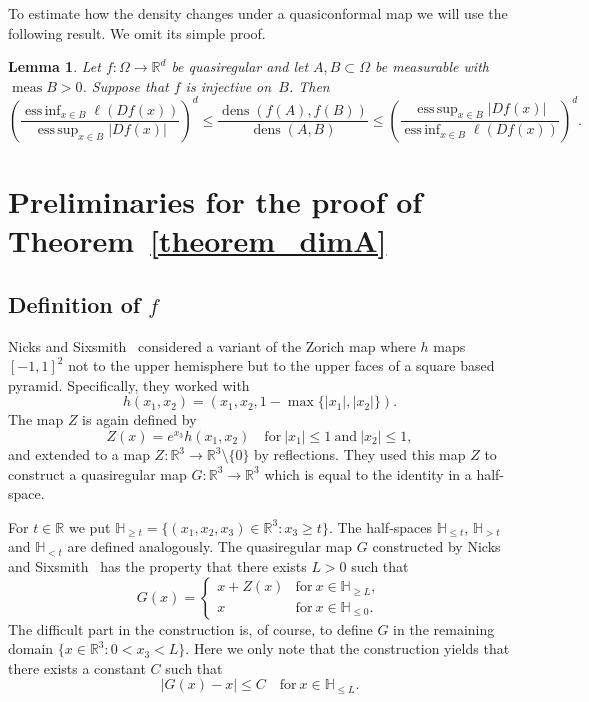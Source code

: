 \documentclass[12pt,a4paper]{amsart}
\theoremstyle{plain}
\newtheorem{lemma}[theorem]{Lemma}
\theoremstyle{definition}
\theoremstyle{remark}
\DeclareMathOperator*{\esssup}{ess\,sup}
\DeclareMathOperator*{\essinf}{ess\,inf}
\def\R{\mathbb R}
\def\H{\mathbb H}
\def\dens{\operatorname{dens}}
\def\meas{\operatorname{meas}}
\numberwithin{equation}{section}
\begin{document}
To estimate how the density changes under a quasiconformal map we will use the 
following result.
We omit its simple proof.
\begin{lemma} \label{lemma-dens}
Let $f\colon \Omega\to\R^d$ be quasiregular and let $A,B\subset \Omega$ be measurable 
with $\meas B>0$. Suppose that $f$ is injective on~$B$.
Then 
\begin{equation}\label{2b}
\left(\frac{\essinf_{x\in B}\ell(Df(x))}{\esssup_{x\in B}|Df(x)|}\right)^d
\leq 
\frac{\dens(f(A),f(B))}{\dens(A,B)}
\leq 
\left(\frac{\esssup_{x\in B}|Df(x)|}{\essinf_{x\in B}\ell(Df(x))}\right)^d .
\end{equation}
\end{lemma}


\section{Preliminaries for the proof of Theorem~\ref{theorem_dimA}} \label{proof1}
\subsection{Definition of \texorpdfstring{$f$}{f}} \label{def_f}
Nicks and Sixsmith~\cite[Section~5]{Nicks2018}
 considered a variant of the Zorich map where 
$h$ maps $[-1,1]^2$ not to the upper hemisphere but 
to the upper faces of a square based pyramid.
Specifically, they worked with 
\begin{equation}\label{1a}
h(x_1,x_2)=(x_1,x_2,1-\max\{|x_1|,|x_2|\}).
\end{equation}
The map $Z$ is again defined by 
\begin{equation}\label{1b}
Z(x)=e^{x_3}h(x_1,x_2)
\quad\text{for}\ |x_1|\leq 1\ \text{and}\ |x_2|\leq 1,
\end{equation}
and extended to a map $Z\colon\R^3\to \R^3\setminus\{0\}$ by
reflections.
They used this map $Z$ to construct a quasiregular map $G\colon\R^3\to\R^3$ 
which is equal to the identity in a half-space. 

For $t\in\R$ we put $\H_{\geq t}=\{(x_1,x_2,x_3)\in\R^3\colon x_3\geq t\}$.
The half-spaces $\H_{\leq t}$, $\H_{> t}$ and $\H_{< t}$ are defined 
analogously.
The quasiregular map $G$ constructed by 
Nicks and Sixsmith~\cite[Section~6]{Nicks2018} has the property
that there exists $L>0$ such that 
\begin{equation}\label{1c}
G(x)=
\begin{cases}
x+Z(x) &\text{for}\ x\in\H_{\geq L},\\
x &\text{for}\ x\in\H_{\leq 0}.
\end{cases}
\end{equation}
The difficult part in the construction is, of course, to define $G$ 
in the remaining domain
$\{x\in\R^3\colon 0<x_3<L\}$. Here we only note that the construction
yields that there exists a constant $C$ such that 
\begin{equation}\label{1c1}
|G(x)-x|\leq C
\quad\text{for}\ x\in\H_{\leq L}.
\end{equation}
\end{document}
